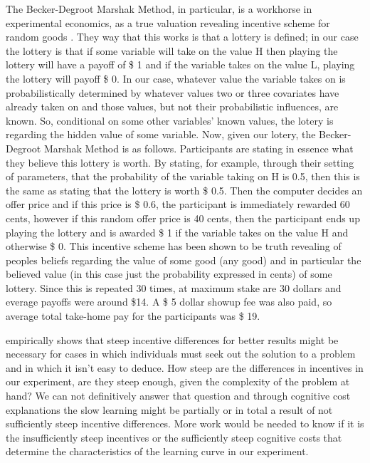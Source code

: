 The Becker-Degroot Marshak Method, in particular, is a workhorse in experimental economics, as a true valuation revealing incentive scheme for random goods \cite{ortega2018mitigating, tymula2016flexible, diro2016effect}. 
They way that this works is that a lottery is defined; in our case the lottery is that if some variable will take on the value H then playing the lottery will have a payoff of \$ 1 and if the variable takes on the value L, playing the lottery will payoff \$ 0.  In our case, whatever value the variable takes on is probabilistically determined by whatever values two or three covariates have already taken on and those values, but not their probabilistic influences, are known.  So, conditional on some other variables' known values, the lotery is regarding the hidden value of some variable.  Now, given our lotery, the Becker-Degroot Marshak Method is as follows.  Participants are stating in essence what they believe this lottery is worth.  By stating, for example, through their setting of parameters, that the probability of the variable taking on H is 0.5, then this is the same as stating that the lottery is worth \$ 0.5.  Then the computer decides an offer price and if this price is \$ 0.6, the participant is immediately rewarded 60 cents, however if this random offer price is 40 cents, then the participant ends up playing the lottery and is awarded \$ 1 if the variable takes on the value H and otherwise \$ 0.  This incentive scheme has been shown to be truth revealing of peoples beliefs regarding the value of some good (any good) and in particular the believed value (in this case just the probability expressed in cents) of some lottery.  Since this is repeated 30 times, at maximum stake are 30 dollars and everage payoffs were around \$14.  A \$ 5 dollar showup fee was also paid, so average total take-home pay for the participants was \$ 19.    

\cite{irwing98} empirically shows that steep incentive differences for better results might be necessary for cases in which individuals must seek out the solution to a problem and in which it isn't easy to deduce.  How steep are the differences in incentives in our experiment, are they steep enough, given the complexity of the problem at hand?  We can not definitively answer that question and through cognitive cost explanations the slow learning might be partially or in total a result of not sufficiently steep incentive differences. More work would be needed to know if it is the insufficiently steep incentives or the sufficiently steep cognitive costs that determine the characteristics of the learning curve in our experiment.     
